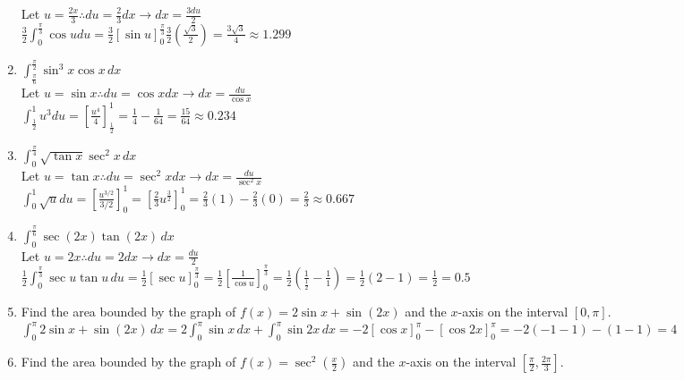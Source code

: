 \documentclass[10pt, letterpaper]{report}
\begin{document}
\begin{enumerate}
    Let $u=\frac{2x}{3}\therefore du=\frac{2}{3}dx\rightarrow dx=\frac{3du}{2}$ \\

    $\frac{3}{2}\int_{0}^{\frac{\pi}{3}}\cos{u}du=
    \frac{3}{2}[\sin{u}]_{0}^{\frac{\pi}{3}}
    \frac{3}{2}(\frac{\sqrt{3}}{2})=
    \frac{3\sqrt{3}}{4}\approx1.299$ \\

  \item{$\int_{\frac{\pi}{6}}^{\frac{\pi}{2}}\sin^{3}{x}\cos{x}\,dx$} \\

    Let $u=\sin{x}\therefore du=\cos{x}dx\rightarrow dx=\frac{du}{\cos{x}}$ \\

    $\int_{\frac{1}{2}}^{1}u^{3}du=
    [\frac{u^4}{4}]_{\frac{1}{2}}^{1}=
    \frac{1}{4}-\frac{1}{64}=\frac{15}{64}\approx 0.234$ \\

  \item{$\int_{0}^{\frac{\pi}{4}}\sqrt{\tan{x}}\sec^{2}{x}\,dx$} \\

    Let $u=\tan{x}\therefore du=\sec^{2}{x}dx\rightarrow dx=\frac{du}{\sec^{2}{x}}$ \\

    $\int_{0}^{1}\sqrt{u}du=
    [\frac{u^{3/2}}{3/2}]_{0}^{1}=
    [\frac{2}{3}u^{\frac{3}{2}}]_{0}^{1}=
    \frac{2}{3}(1)-\frac{2}{3}(0)=\frac{2}{3}\approx 0.667$ \\

  \item{$\int_{0}^{\frac{\pi}{6}}\sec{(2x)}\tan{(2x)}\,dx$} \\

    Let $u=2x\therefore du=2dx \rightarrow dx=\frac{du}{2}$ \\

    $\frac{1}{2}\int_{0}^{\frac{\pi}{3}}\sec{u}\tan{u}\,du=
    \frac{1}{2}[\sec{u}]_{0}^{\frac{\pi}{3}}=
    \frac{1}{2}[\frac{1}{\cos{u}}]_{0}^{\frac{\pi}{3}}=
    \frac{1}{2}(\frac{1}{\frac{1}{2}}-\frac{1}{1})=
    \frac{1}{2}(2-1)=\frac{1}{2}=0.5$ \\
\hline
  \item{Find the area bounded by the graph of $f(x)=2\sin{x}+\sin{(2x)}$ and the $x$-axis on the interval $[0,\pi]$.} \\

    $\int_{0}^{\pi}2\sin{x}+\sin{(2x)}\,dx=
    2\int_{0}^{\pi}\sin{x}\,dx+\int_{0}^{\pi}\sin{2x}\,dx=
    -2[\cos{x}]_{0}^{\pi}-[\cos{2x}]_{0}^{\pi}=
    -2(-1-1)-(1-1)=4$ \\
\pagebreak
  \item{Find the area bounded by the graph of $f(x)=\sec^{2}{(\frac{x}{2})}$ and the $x$-axis on the interval $[\frac{\pi}{2},\frac{2\pi}{3}]$.} \\


\end{enumerate}
\end{document}
